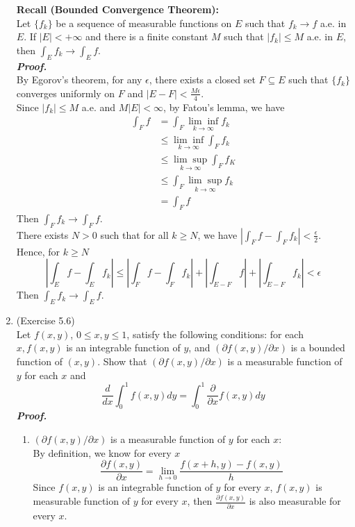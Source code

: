 \documentclass[a4paper,11pt]{article}
\begin{document}
\begin{enumerate}
 \textbf{Recall (Bounded Convergence Theorem):}\\
 Let $\{ f_k \}$ be a sequence of measurable functions on $E$ such that $f_k \to f$ a.e. in $E$. If $|E| < +\infty$ and there is a finite constant $M$ such that $|f_k| \leq M$ a.e. in $E$, then $\int_E f_k \to \int_E f$.\\
 \newline
 \textit{\textbf {Proof.}}\\
 By Egorov's theorem, for any $\epsilon$, there exists a closed set $F \subseteq E$ such that $\{ f_k \}$ converges uniformly on $F$ and $|E - F| < \frac{M \epsilon}{4}$.\\
 Since $|f_k| \leq M$ a.e. and $M|E| < \infty$, by Fatou's lemma, we have
 $$\begin{aligned}
 \int_F f
 &= \int_F \underset{k \to \infty}{\lim \inf} f_k\\
 &\leq \underset{k \to \infty}{\lim \inf} \int_F f_k\\
 &\leq \underset{k \to \infty}{\lim \sup} \int_F f_K\\
 &\leq \int_F \underset{k \to \infty}{\lim \sup} f_k\\
 &= \int_F f
 \end{aligned}$$
 Then $\int_F f_k \to \int_F f$.\\
 There exists $N > 0$ such that for all $k \geq N$, we have $\left| \int_F f - \int_F f_k \right| < \frac{\epsilon}{2}$.\\
 Hence, for $k \geq N$
 $$\left| \int_E f - \int_E f_k \right|
 \leq \left| \int_F f - \int_F f_k \right| + \left| \int_{E - F} f \right| + \left| \int_{E - F} f_k \right| < \epsilon$$
 Then $\int_E f_k \to \int_E f$.\\
 






\item (Exercise 5.6)\\
 Let $f(x,y)$, $0 \leq x, y \leq 1$, satisfy the following conditions: for each $x, f(x,y)$ is an integrable function of $y$, and $(\partial f(x,y) / \partial x)$ is a bounded function of $(x,y)$. Show that $(\partial f(x,y) / \partial x)$ is a measurable function of $y$ for each $x$ and
 $$\frac{d}{dx} \int_{0}^{1} f(x,y) dy = \int_{0}^{1} \frac{\partial}{ \partial x} f(x, y) dy$$
 \newline
 \textit{\textbf {Proof.}}

 \begin{enumerate}
 \item $(\partial f(x,y) / \partial x)$ is a measurable function of $y$ for each $x$:\\
 By definition, we know for every $x$
 $$\frac{\partial f(x,y)}{ \partial x} = \underset{h \to 0}{\lim} \frac{f(x+h,y) - f(x,y)}{h}$$
 Since $f(x,y)$ is an integrable function of $y$ for every $x$, $f(x,y)$ is measurable function of $y$ for every $x$, then $\frac{\partial f(x,y)}{ \partial x}$ is also measurable for every $x$.\\


\end{enumerate}
\end{enumerate}
\end{document}
